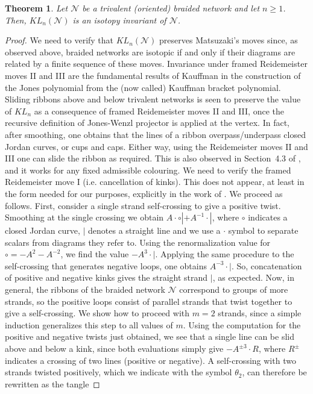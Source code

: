 \documentclass[aps,nofootinbib,amsfonts,superscriptaddress]{revtex4}
\newtheorem{theorem}{Theorem}
\begin{document}
\begin{theorem}\label{thm:invariant}
Let $\mathcal N$ be a trivalent (oriented) braided network and let $n\geq 1$. Then, $KL_n (\mathcal N)$ is an isotopy invariant of $\mathcal N$.
\end{theorem}
\begin{proof}
We need to verify that $KL_n (\mathcal N)$ preserves Matsuzaki's moves since, as observed above, braided networks are isotopic if and only if their diagrams are related by a finite sequence of these moves. Invariance under framed Reidemeister moves II and III are the fundamental results of Kauffman in the construction of the Jones polynomial from the (now called) Kauffman bracket polynomial. Sliding ribbons above and below trivalent networks is seen to preserve the value of $KL_n$ as a consequence of framed Reidemeister moves II and III, once the recursive definition of Jones-Wenzl projector is applied at the vertex. In fact, after smoothing, one obtains that the lines of a ribbon overpass/underpass closed Jordan curves, or cups and caps. Either way, using the Reidemeister moves II and III one can slide the ribbon as required. This is also observed in Section~4.3 of \cite{KL}, and it works for any fixed admissible colouring. We need to verify the framed Reidemeister move I (i.e. cancellation of kinks). This does not appear, at least in the form needed for our purposes, explicitly in the work of \cite{KL}. We proceed as follows. First, consider a single strand self-crossing to give a positive twist. Smoothing at the single crossing we obtain $A\cdot \circ | + A^{-1}\cdot |$, where $\circ$ indicates a closed Jordan curve, $|$ denotes a straight line and we use a $\cdot$ symbol to separate scalars from diagrams they refer to. Using the renormalization value for $\circ = -A^2-A^{-2}$, we find the value $-A^3\cdot |$. Applying the same procedure to the self-crossing that generates negative loops, one obtains $A^{-3}\cdot |$. So, concatenation of positive and negative kinks gives the straight strand $|$, as expected. Now, in general, the ribbons of the braided network $\mathcal N$ correspond to groups of more strands, so the positive loops consist of parallel strands that twist together to give a self-crossing. We show how to proceed with $m=2$ strands, since a simple induction generalizes this step to all values of $m$. Using the computation for the positive and negative twists just obtained, we see that a single line can be slid above and below a kink, since both evaluations simply give $-A^{\pm3}\cdot R$, where $R^{\pm}$ indicates a crossing of two lines (positive or negative). A self-crossing with two strands twisted positively, which we indicate with the symbol $\theta_2$, can therefore be rewritten as the tangle

\end{proof}
\end{document}
